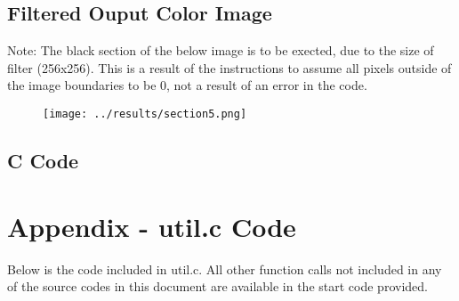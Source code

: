 \documentclass{article}
\begin{document}
\subsection{Filtered Ouput Color Image}
Note: The black section of the below image is to be exected, due to the size of filter (256x256). This is a result of the instructions to assume all pixels outside of the image boundaries to be 0, not a result of an error in the code.
\begin{figure}[H]
    \centering
    \texttt{[image: ../results/section5.png]}
    \begin{center}
    \end{center}
\end{figure}
\subsection{C Code}


\section{Appendix - util.c Code}
Below is the code included in util.c. All other function calls not included in any of the source codes in this document are available in the start code provided.

\end{document}
